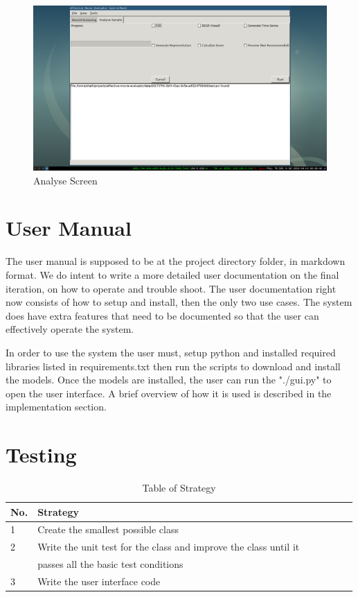 \documentclass[12pt,a4paper,man]{report}
\begin{document}
\begin{figure}[htbp]
\centering
\includegraphics[width=5in]{./ext_img/sc3.png}
\caption{\label{fig:sc3}
Analyse Screen}
\end{figure}

\section{User Manual}
\label{sec:org0260981}
The user manual is supposed to be at the project directory folder, in markdown format. We do intent to write a more detailed user documentation on the final iteration, on how to operate and trouble shoot. The user documentation right now consists of how to setup and install, then the only two use cases. The system does have extra features that need to be documented so that the user can effectively operate the system.

In order to use the system the user must, setup python and installed required libraries listed in requirements.txt then run the scripts to download and install the models. Once the models are installed, the user can run the "./gui.py" to open the user interface. A brief overview of how it is used is described in the implementation section.

\section{Testing}
\label{sec:org2511ebd}


\begin{table}[htbp]
\caption{\label{table:strattable}
Table of Strategy}
\centering
\begin{tabular}{|l|l|l|l|l|lp{3cm}|}
\hline
\textbf{No.} & \textbf{Strategy}\\
\hline
1 & Create the smallest possible class\\
\hline
2 & Write the unit test for the class    and improve the class until it\\
 & passes all the basic test conditions\\
\hline
3 & Write the user interface code\\
\hline
\end{tabular}
\end{table}
\end{document}
